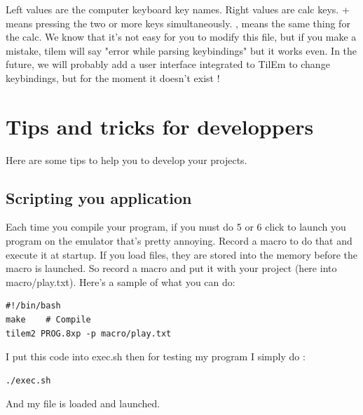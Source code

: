 \documentclass[10pt]{report}
\begin{document}
Left values are the computer keyboard key names.\newline
Right values are calc keys.\newline
+ means pressing the two or more keys simultaneously.\newline
, means the same thing for the calc.\newline
We know that it's not easy for you to modify this file, but if you make a mistake, tilem will say "error while parsing keybindings" but it works even.\newline
In the future, we will probably add a user interface integrated to TilEm to change keybindings, but for the moment it doesn't exist !\newline

\chapter{Tips and tricks for developpers}

Here are some tips to help you to develop your projects.\newline

\section{Scripting you application}
Each time you compile your program, if you must do 5 or 6 click to launch you program on the emulator that's pretty annoying.\newline\newline
Record a macro to do that and execute it at startup.\newline
If you load files, they are stored into the memory before the macro is launched.\newline
So record a macro and put it with your project (here into macro/play.txt).\newline
Here's a sample of what you can do:\newline
\begin{lstlisting}
#!/bin/bash
make	# Compile
tilem2 PROG.8xp -p macro/play.txt
\end{lstlisting}

I put this code into exec.sh then for testing my program I simply do :\newline
\begin{lstlisting}
./exec.sh
\end{lstlisting}

And my file is loaded and launched.
\end{document}
